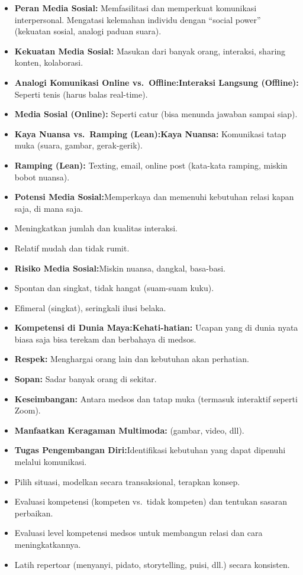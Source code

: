 \documentclass[
  letterpaper,
  DIV=11,
  numbers=noendperiod]{scrreprt}
\providecommand{\tightlist}{%
  \setlength{\itemsep}{0pt}\setlength{\parskip}{0pt}}
\begin{document}
\begin{itemize}
\tightlist
\item
  \textbf{Peran Media Sosial:} Memfasilitasi dan memperkuat komunikasi
  interpersonal. Mengatasi kelemahan individu dengan ``social power''
  (kekuatan sosial, analogi paduan suara).
\item
  \textbf{Kekuatan Media Sosial:} Masukan dari banyak orang, interaksi,
  sharing konten, kolaborasi.
\item
  \textbf{Analogi Komunikasi Online vs.~Offline:Interaksi Langsung
  (Offline):} Seperti tenis (harus balas real-time).
\item
  \textbf{Media Sosial (Online):} Seperti catur (bisa menunda jawaban
  sampai siap).
\item
  \textbf{Kaya Nuansa vs.~Ramping (Lean):Kaya Nuansa:} Komunikasi tatap
  muka (suara, gambar, gerak-gerik).
\item
  \textbf{Ramping (Lean):} Texting, email, online post (kata-kata
  ramping, miskin bobot nuansa).
\item
  \textbf{Potensi Media Sosial:}Memperkaya dan memenuhi kebutuhan relasi
  kapan saja, di mana saja.
\item
  Meningkatkan jumlah dan kualitas interaksi.
\item
  Relatif mudah dan tidak rumit.
\item
  \textbf{Risiko Media Sosial:}Miskin nuansa, dangkal, basa-basi.
\item
  Spontan dan singkat, tidak hangat (suam-suam kuku).
\item
  Efimeral (singkat), seringkali ilusi belaka.
\item
  \textbf{Kompetensi di Dunia Maya:Kehati-hatian:} Ucapan yang di dunia
  nyata biasa saja bisa terekam dan berbahaya di medsos.
\item
  \textbf{Respek:} Menghargai orang lain dan kebutuhan akan perhatian.
\item
  \textbf{Sopan:} Sadar banyak orang di sekitar.
\item
  \textbf{Keseimbangan:} Antara medsos dan tatap muka (termasuk
  interaktif seperti Zoom).
\item
  \textbf{Manfaatkan Keragaman Multimoda:} (gambar, video, dll).
\item
  \textbf{Tugas Pengembangan Diri:}Identifikasi kebutuhan yang dapat
  dipenuhi melalui komunikasi.
\item
  Pilih situasi, modelkan secara transaksional, terapkan konsep.
\item
  Evaluasi kompetensi (kompeten vs.~tidak kompeten) dan tentukan sasaran
  perbaikan.
\item
  Evaluasi level kompetensi medsos untuk membangun relasi dan cara
  meningkatkannya.
\item
  Latih repertoar (menyanyi, pidato, storytelling, puisi, dll.) secara
  konsisten.
\end{itemize}
\end{document}

